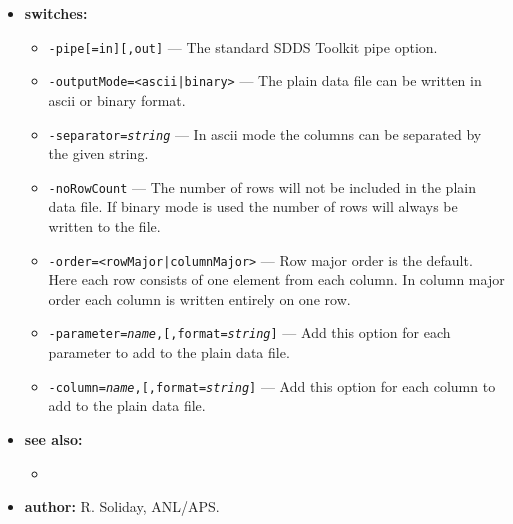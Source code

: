 \begin{itemize}
\item {\bf switches:}
    \begin{itemize}
    \item {\tt -pipe[=in][,out]} --- The standard SDDS Toolkit pipe option.
    \item {\tt -outputMode=<ascii|binary>} --- The plain data file can be written in ascii or binary format.
    \item {\tt -separator={\em string}} --- In ascii mode the columns can be separated by the given string.
    \item {\tt -noRowCount} --- The number of rows will not be included in the plain data file. 
	If binary mode is used the number of rows will always be written to the file.
    \item {\tt -order=<rowMajor|columnMajor>} --- Row major order is the default. 
	Here each row consists of one element from each column. 
	In column major order each column is written entirely on one row.
    \item {\tt -parameter={\em name},[,format={\em string}]} --- 
	Add this option for each parameter to add to the plain data file.
    \item {\tt -column={\em name},[,format={\em string}]} --- 
	Add this option for each column to add to the plain data file.
    \end{itemize}
\item {\bf see also:}
    \begin{itemize}
    \item {}
    \end{itemize}
\item {\bf author:} R. Soliday, ANL/APS.
\end{itemize}


